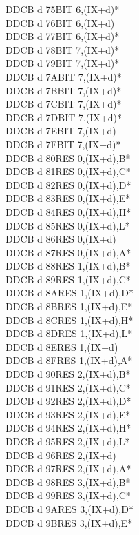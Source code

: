 \documentclass[oneside,a4paper]{book}
\begin{document}
\begin{multicols}{3}
{\begin{tabbing}
DDCB d 75\>BIT 6,(IX+d)*\\
DDCB d 76\>BIT 6,(IX+d)\\
DDCB d 77\>BIT 6,(IX+d)*\\
DDCB d 78\>BIT 7,(IX+d)*\\
DDCB d 79\>BIT 7,(IX+d)*\\
DDCB d 7A\>BIT 7,(IX+d)*\\
DDCB d 7B\>BIT 7,(IX+d)*\\
DDCB d 7C\>BIT 7,(IX+d)*\\
DDCB d 7D\>BIT 7,(IX+d)*\\
DDCB d 7E\>BIT 7,(IX+d)\\
DDCB d 7F\>BIT 7,(IX+d)*\\
DDCB d 80\>RES 0,(IX+d),B*\\
DDCB d 81\>RES 0,(IX+d),C*\\
DDCB d 82\>RES 0,(IX+d),D*\\
DDCB d 83\>RES 0,(IX+d),E*\\
DDCB d 84\>RES 0,(IX+d),H*\\
DDCB d 85\>RES 0,(IX+d),L*\\
DDCB d 86\>RES 0,(IX+d)\\
DDCB d 87\>RES 0,(IX+d),A*\\
DDCB d 88\>RES 1,(IX+d),B*\\
DDCB d 89\>RES 1,(IX+d),C*\\
DDCB d 8A\>RES 1,(IX+d),D*\\
DDCB d 8B\>RES 1,(IX+d),E*\\
DDCB d 8C\>RES 1,(IX+d),H*\\
DDCB d 8D\>RES 1,(IX+d),L*\\
DDCB d 8E\>RES 1,(IX+d)\\
DDCB d 8F\>RES 1,(IX+d),A*\\
DDCB d 90\>RES 2,(IX+d),B*\\
DDCB d 91\>RES 2,(IX+d),C*\\
DDCB d 92\>RES 2,(IX+d),D*\\
DDCB d 93\>RES 2,(IX+d),E*\\
DDCB d 94\>RES 2,(IX+d),H*\\
DDCB d 95\>RES 2,(IX+d),L*\\
DDCB d 96\>RES 2,(IX+d)\\
DDCB d 97\>RES 2,(IX+d),A*\\
DDCB d 98\>RES 3,(IX+d),B*\\
DDCB d 99\>RES 3,(IX+d),C*\\
DDCB d 9A\>RES 3,(IX+d),D*\\
DDCB d 9B\>RES 3,(IX+d),E*\\

\end{tabbing}}
\end{multicols}
\end{document}
